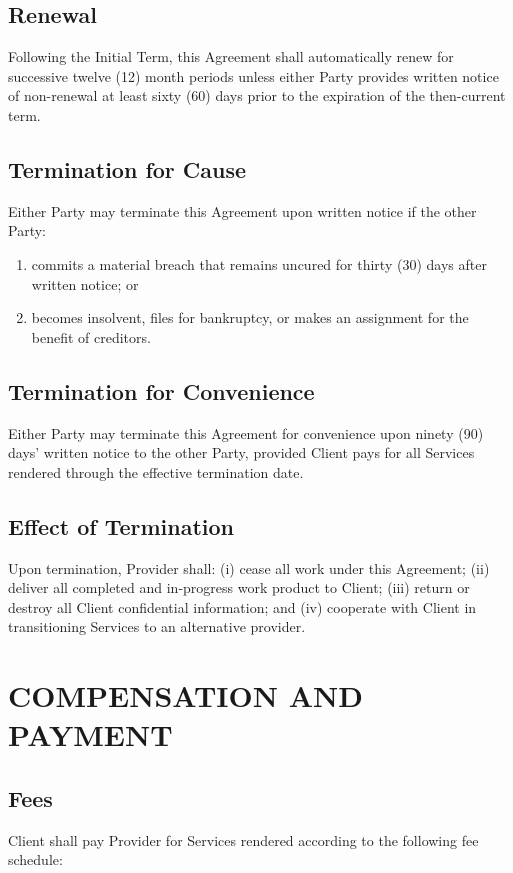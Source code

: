 \documentclass[
    language=english,
    doctype=contract,
    institution=none,
]{../../omnilatex}
\begin{document}
\subsection{Renewal}
Following the Initial Term, this Agreement shall automatically renew for successive twelve (12) month periods unless either Party provides written notice of non-renewal at least sixty (60) days prior to the expiration of the then-current term.

\subsection{Termination for Cause}
Either Party may terminate this Agreement upon written notice if the other Party:
\begin{enumerate}[label=(\alph*)]
    \item commits a material breach that remains uncured for thirty (30) days after written notice; or
    \item becomes insolvent, files for bankruptcy, or makes an assignment for the benefit of creditors.
\end{enumerate}

\subsection{Termination for Convenience}
Either Party may terminate this Agreement for convenience upon ninety (90) days' written notice to the other Party, provided Client pays for all Services rendered through the effective termination date.

\subsection{Effect of Termination}
Upon termination, Provider shall: (i) cease all work under this Agreement; (ii) deliver all completed and in-progress work product to Client; (iii) return or destroy all Client confidential information; and (iv) cooperate with Client in transitioning Services to an alternative provider.

\section{COMPENSATION AND PAYMENT}

\subsection{Fees}
Client shall pay Provider for Services rendered according to the following fee schedule:
\end{document}
